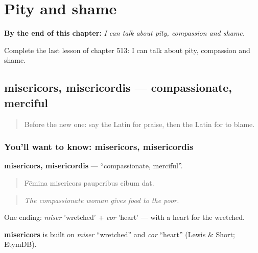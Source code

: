 
\chapter{Pity and shame}
\label{ch:la-pity-and-shame}

\begin{chapteropening}
\textbf{By the end of this chapter:} \emph{I can talk about pity, compassion and shame.}

Complete the last lesson of chapter 513: I can talk about pity, compassion and shame.
\end{chapteropening}

\section[misericors, misericordis]{misericors, misericordis — compassionate, merciful}

\label{lesson:LA-C513-misericors}



\begin{quote}
Before the new one: say the Latin for praise, then the Latin for to blame.
\end{quote}

\subsection*{You'll want to know: misericors, misericordis}
\textbf{misericors, misericordis} — \textquotedblleft{}compassionate, merciful\textquotedblright{}.

\begin{quote}
Fēmina misericors pauperibus cibum dat.
\end{quote}

\begin{quote}
\emph{The compassionate woman gives food to the poor.}
\end{quote}

One ending: \emph{miser} 'wretched' + \emph{cor} 'heart' — with a heart for the wretched.

\begin{cousinweb}
\textbf{misericors} is built on \emph{miser} \textquotedblleft{}wretched\textquotedblright{} and \emph{cor} \textquotedblleft{}heart\textquotedblright{} (Lewis \& Short; EtymDB).
\end{cousinweb}

